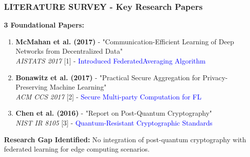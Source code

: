 \documentclass[aspectratio=169]{beamer}
\begin{document}
\begin{frame}
    \frametitle{LITERATURE SURVEY - Key Research Papers}
    \textbf{3 Foundational Papers:}
    
    \begin{enumerate}
        \item \textbf{McMahan et al. (2017)} - "Communication-Efficient Learning of Deep Networks from Decentralized Data" 
        \\ \textit{AISTATS 2017} [1] - \textcolor{blue}{Introduced FederatedAveraging Algorithm}
        
        \item \textbf{Bonawitz et al. (2017)} - "Practical Secure Aggregation for Privacy-Preserving Machine Learning"
        \\ \textit{ACM CCS 2017} [2] - \textcolor{blue}{Secure Multi-party Computation for FL}
        
        \item \textbf{Chen et al. (2016)} - "Report on Post-Quantum Cryptography"
        \\ \textit{NIST IR 8105} [3] - \textcolor{blue}{Quantum-Resistant Cryptographic Standards}
    \end{enumerate}
    
    \vspace{0.5cm}
    \textbf{Research Gap Identified:} No integration of post-quantum cryptography with federated learning for edge computing scenarios.
\end{frame}
\end{document}
